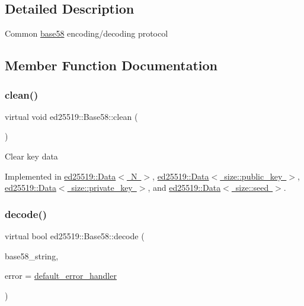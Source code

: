 \subsection{Detailed Description}
Common \mbox{\hyperlink{namespaceed25519_1_1base58}{base58}} encoding/decoding protocol 

\subsection{Member Function Documentation}
\mbox{\label{classed25519_1_1_base58_aed901927e6a283e0c4d3fb13745233dc}} 
\subsubsection{\texorpdfstring{clean()}{clean()}}
{\footnotesize\ttfamily virtual void ed25519\+::\+Base58\+::clean (\begin{DoxyParamCaption}{ }\end{DoxyParamCaption})\hspace{0.3cm}{\ttfamily [pure virtual]}}

Clear key data 

Implemented in \mbox{\hyperlink{classed25519_1_1_data_a22626c9e5a951dd673bfda8e78bf14fc}{ed25519\+::\+Data$<$ N $>$}}, \mbox{\hyperlink{classed25519_1_1_data_a22626c9e5a951dd673bfda8e78bf14fc}{ed25519\+::\+Data$<$ size\+::public\+\_\+key $>$}}, \mbox{\hyperlink{classed25519_1_1_data_a22626c9e5a951dd673bfda8e78bf14fc}{ed25519\+::\+Data$<$ size\+::private\+\_\+key $>$}}, and \mbox{\hyperlink{classed25519_1_1_data_a22626c9e5a951dd673bfda8e78bf14fc}{ed25519\+::\+Data$<$ size\+::seed $>$}}.

\mbox{\label{classed25519_1_1_base58_a3cb74be32923dcfb03a24b65015bee84}} 
\subsubsection{\texorpdfstring{decode()}{decode()}}
{\footnotesize\ttfamily virtual bool ed25519\+::\+Base58\+::decode (\begin{DoxyParamCaption}\item[{const std\+::string \&}]{base58\+\_\+string,  }\item[{const \mbox{\hyperlink{namespaceed25519_a6ba572942b3c18591fc869d52a6b16e6}{Error\+Handler}} \&}]{error = {\ttfamily \mbox{\hyperlink{namespaceed25519_a7c7bb6ed17541162959c33ed3e3b15fb}{default\+\_\+error\+\_\+handler}}} }\end{DoxyParamCaption})\hspace{0.3cm}{\ttfamily [pure virtual]}}

